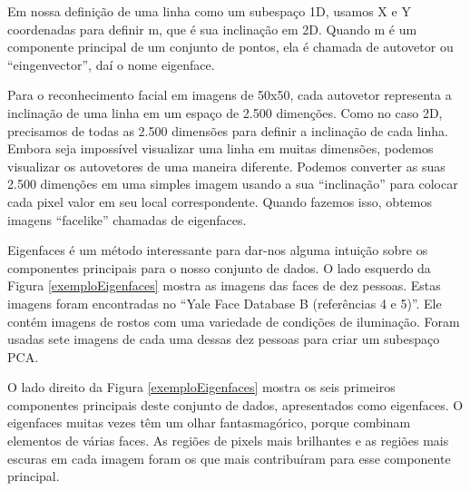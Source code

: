Em nossa definição de uma linha como um subespaço 1D, usamos X e Y coordenadas para definir m, que é sua inclinação em 2D. Quando m é um componente principal de um conjunto de pontos, ela é chamada de autovetor ou ``eingenvector'', daí o nome eigenface. 

Para o reconhecimento facial em imagens de 50x50, cada autovetor representa a inclinação de uma linha em um espaço de 2.500 dimenções. Como no caso 2D, precisamos de todas as 2.500 dimensões para definir a inclinação de cada linha. Embora seja impossível visualizar uma linha em muitas dimensões, podemos visualizar os autovetores de uma maneira diferente. Podemos converter as suas 2.500 dimenções em uma simples imagem usando a sua ``inclinação'' para colocar cada pixel valor em seu local correspondente. Quando fazemos isso, obtemos imagens ``facelike'' chamadas de eigenfaces.

Eigenfaces é um método interessante para dar-nos alguma intuição sobre os componentes principais para o nosso conjunto de dados. O lado esquerdo da Figura \ref{exemploEigenfaces} mostra as imagens das faces de dez pessoas. Estas imagens foram encontradas no ``Yale Face Database B (referências 4 e 5)''. Ele contém imagens de rostos com uma variedade de condições de iluminação. Foram usadas sete imagens de cada uma dessas dez pessoas para criar um subespaço PCA. 

O lado direito da Figura \ref{exemploEigenfaces} mostra os seis primeiros componentes principais deste conjunto de dados, apresentados como eigenfaces. O eigenfaces muitas vezes têm um olhar fantasmagórico, porque combinam elementos de várias faces. As regiões de pixels mais brilhantes e as regiões mais escuras em cada imagem foram os que mais contribuíram para esse componente principal. 

